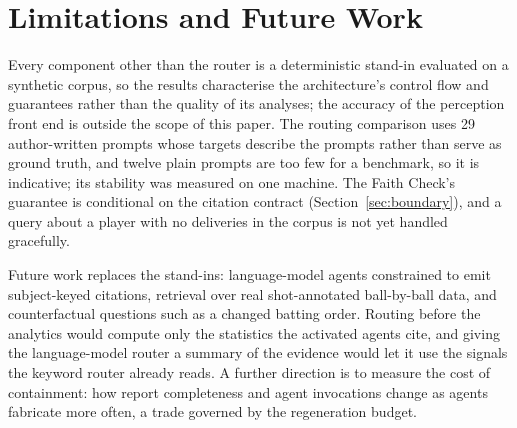 \section{Limitations and Future Work}
\label{sec:limitations}

Every component other than the router is a deterministic stand-in evaluated on
a synthetic corpus, so the results characterise the architecture's control flow
and guarantees rather than the quality of its analyses; the accuracy of the
perception front end is outside the scope of this paper. The routing comparison
uses 29 author-written prompts whose targets describe the prompts rather than
serve as ground truth, and twelve plain prompts are too few for a benchmark, so
it is indicative; its stability was measured on one machine. The Faith Check's
guarantee is conditional on the citation contract (Section~\ref{sec:boundary}),
and a query about a player with no deliveries in the corpus is not yet handled
gracefully.

Future work replaces the stand-ins: language-model agents constrained to emit
subject-keyed citations, retrieval over real shot-annotated ball-by-ball data,
and counterfactual questions such as a changed batting order. Routing before the
analytics would compute only the statistics the activated agents cite, and
giving the language-model router a summary of the evidence would let it use the
signals the keyword router already reads. A further direction is to measure the
cost of containment: how report completeness and agent invocations change as
agents fabricate more often, a trade governed by the regeneration budget.
